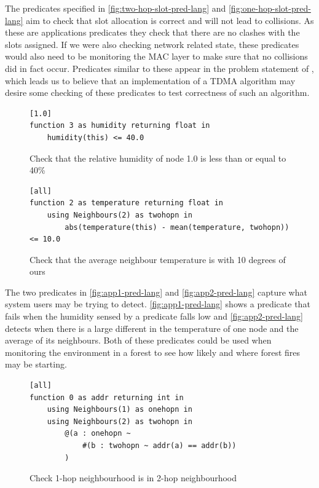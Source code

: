 The predicates specified in \autoref{fig:two-hop-slot-pred-lang} and \autoref{fig:one-hop-slot-pred-lang} aim to check that slot allocation is correct and will not lead to collisions. As these are applications predicates they check that there are no clashes with the slots assigned. If we were also checking network related state, these predicates would also need to be monitoring the MAC layer to make sure that no collisions did in fact occur. Predicates similar to these appear in the problem statement of \cite{DBLP:journals/corr/abs-0808-0920}, which leads us to believe that an implementation of a TDMA algorithm may desire some checking of these predicates to test correctness of such an algorithm.

\begin{figure}[H]
\begin{verbatim}
[1.0]
function 3 as humidity returning float in
    humidity(this) <= 40.0
\end{verbatim}
\caption{Check that the relative humidity of node 1.0 is less than or equal to 40\%}
\label{fig:app1-pred-lang}
\end{figure}

\begin{figure}[H]
\begin{verbatim}
[all]
function 2 as temperature returning float in
    using Neighbours(2) as twohopn in
        abs(temperature(this) - mean(temperature, twohopn)) <= 10.0
\end{verbatim}
\caption{Check that the average neighbour temperature is with 10 degrees of ours}
\label{fig:app2-slot-pred-lang}
\end{figure}

The two predicates in \autoref{fig:app1-pred-lang} and \autoref{fig:app2-pred-lang} capture what system users may be trying to detect. \autoref{fig:app1-pred-lang} shows a predicate that fails when the humidity sensed by a predicate falls low and \autoref{fig:app2-pred-lang} detects when there is a large different in the temperature of one node and the average of its neighbours. Both of these predicates could be used when monitoring the environment in a forest to see how likely and where forest fires may be starting. 


\begin{figure}[H]
\begin{verbatim}
[all]
function 0 as addr returning int in
    using Neighbours(1) as onehopn in
    using Neighbours(2) as twohopn in
        @(a : onehopn ~
            #(b : twohopn ~ addr(a) == addr(b))
        )
\end{verbatim}
\caption{Check 1-hop neighbourhood is in 2-hop neighbourhood}
\end{figure}

